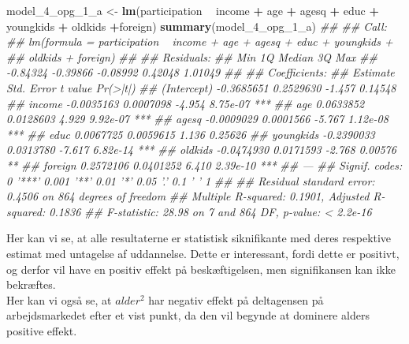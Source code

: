 \documentclass[
  10pt,
]{article}
\newenvironment{Shaded}{\begin{snugshade}}{\end{snugshade}}
\newcommand{\CommentTok}[1]{\textcolor[rgb]{0.56,0.35,0.01}{\textit{#1}}}
\newcommand{\DecValTok}[1]{\textcolor[rgb]{0.00,0.00,0.81}{#1}}
\newcommand{\KeywordTok}[1]{\textcolor[rgb]{0.13,0.29,0.53}{\textbf{#1}}}
\newcommand{\NormalTok}[1]{#1}
\newcommand{\OperatorTok}[1]{\textcolor[rgb]{0.81,0.36,0.00}{\textbf{#1}}}
\newcommand{\StringTok}[1]{\textcolor[rgb]{0.31,0.60,0.02}{#1}}
\begin{document}
\begin{Shaded}
\begin{Highlighting}[]
\NormalTok{model_}\DecValTok{4}\NormalTok{_opg_}\DecValTok{1}\NormalTok{_a <-}\StringTok{ }\KeywordTok{lm}\NormalTok{(participation }\OperatorTok{~}\StringTok{ }\NormalTok{income }\OperatorTok{+}\StringTok{ }\NormalTok{age }\OperatorTok{+}\StringTok{ }\NormalTok{agesq }\OperatorTok{+}\StringTok{ }\NormalTok{educ }\OperatorTok{+}\StringTok{ }\NormalTok{youngkids }
                      \OperatorTok{+}\StringTok{ }\NormalTok{oldkids }\OperatorTok{+}\NormalTok{foreign)}
\KeywordTok{summary}\NormalTok{(model_}\DecValTok{4}\NormalTok{_opg_}\DecValTok{1}\NormalTok{_a)}
\CommentTok{## }
\CommentTok{## Call:}
\CommentTok{## lm(formula = participation ~ income + age + agesq + educ + youngkids + }
\CommentTok{##     oldkids + foreign)}
\CommentTok{## }
\CommentTok{## Residuals:}
\CommentTok{##      Min       1Q   Median       3Q      Max }
\CommentTok{## -0.84324 -0.39866 -0.08992  0.42048  1.01049 }
\CommentTok{## }
\CommentTok{## Coefficients:}
\CommentTok{##               Estimate Std. Error t value Pr(>|t|)    }
\CommentTok{## (Intercept) -0.3685651  0.2529630  -1.457  0.14548    }
\CommentTok{## income      -0.0035163  0.0007098  -4.954 8.75e-07 ***}
\CommentTok{## age          0.0633852  0.0128603   4.929 9.92e-07 ***}
\CommentTok{## agesq       -0.0009029  0.0001566  -5.767 1.12e-08 ***}
\CommentTok{## educ         0.0067725  0.0059615   1.136  0.25626    }
\CommentTok{## youngkids   -0.2390033  0.0313780  -7.617 6.82e-14 ***}
\CommentTok{## oldkids     -0.0474930  0.0171593  -2.768  0.00576 ** }
\CommentTok{## foreign      0.2572106  0.0401252   6.410 2.39e-10 ***}
\CommentTok{## ---}
\CommentTok{## Signif. codes:  0 '***' 0.001 '**' 0.01 '*' 0.05 '.' 0.1 ' ' 1}
\CommentTok{## }
\CommentTok{## Residual standard error: 0.4506 on 864 degrees of freedom}
\CommentTok{## Multiple R-squared:  0.1901, Adjusted R-squared:  0.1836 }
\CommentTok{## F-statistic: 28.98 on 7 and 864 DF,  p-value: < 2.2e-16}
\end{Highlighting}
\end{Shaded}

Her kan vi se, at alle resultaterne er statistisk siknifikante med deres
respektive estimat med untagelse af uddannelse. Dette er interessant,
fordi dette er positivt, og derfor vil have en positiv effekt på
beskæftigelsen, men signifikansen kan ikke bekræftes.\\
Her kan vi også se, at \(alder^2\) har negativ effekt på deltagensen på
arbejdsmarkedet efter et vist punkt, da den vil begynde at dominere
alders positive effekt.
\end{document}
